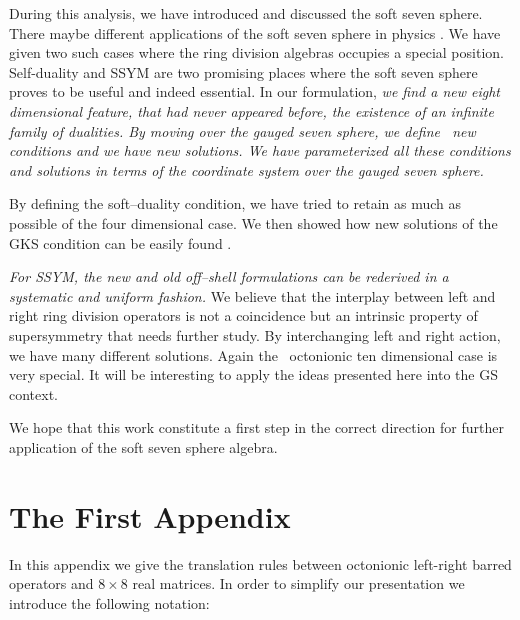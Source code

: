 \documentclass[a4paper,12pt]{book}
\begin{document}
During this analysis, we have introduced and discussed the soft seven
sphere. There maybe different applications of the soft seven sphere in
physics \cite{berk1} \cite{berk2} \cite{brink} \cite{spt}. We have given two
such cases where the ring division algebras occupies a special position.
Self-duality and SSYM are two promising places where the soft seven sphere
proves to be useful and indeed essential. In our formulation, \emph{we find
a new eight dimensional feature, that had never appeared before, the
existence of an infinite family of dualities. By moving over the gauged
seven sphere, we define \ new conditions and we have new solutions. We have
parameterized all these conditions and solutions in terms of the coordinate
system over the gauged seven sphere.}

By defining the soft--duality condition, we have tried to retain as much as
possible of the four dimensional case. We then showed how new solutions of
the GKS condition can be easily found .

\emph{For SSYM, the new and old off--shell formulations can be rederived in
a systematic and uniform fashion.} We believe that the interplay between
left and right ring division operators is not a coincidence but an intrinsic
property of supersymmetry that needs further study. By interchanging left
and right action, we have many different solutions. Again the \ octonionic
ten dimensional case is very special. It will be interesting to apply the
ideas presented here into the GS context.

We hope that this work constitute a first step in the correct direction for
further application of the soft seven sphere algebra.

\appendix


\chapter{The First Appendix}


In this appendix we give the translation rules between octonionic left-right
barred operators and $8\times 8$ real matrices. In order to simplify our
presentation we introduce the following notation:
\end{document}
